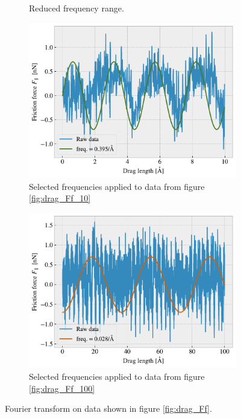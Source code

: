 \begin{figure}[H]
\begin{subfigure}[b]{0.49\textwidth}
      \caption{Reduced frequency range.}
      \label{fig:ft_b}
  \end{subfigure}
  \hfill
  \begin{subfigure}[b]{0.49\textwidth}
      \centering
      \includegraphics[width=\textwidth]{figures/baseline/ft_sine_zoom.pdf}
      \caption{Selected frequencies applied to data from figure \ref{fig:drag_Ff_10}}
      \label{fig:ft_c}
  \end{subfigure}
  \hfill
  \begin{subfigure}[b]{0.49\textwidth}
      \centering
      \includegraphics[width=\textwidth]{figures/baseline/ft_sine.pdf}
      \caption{Selected frequencies applied to data from figure \ref{fig:drag_Ff_100}}
      \label{fig:ft_d}
  \end{subfigure}
  \hfill
     \caption{Fourier transform on data shown in figure \ref{fig:drag_Ff}.}
     \label{fig:ft}
\end{figure}


